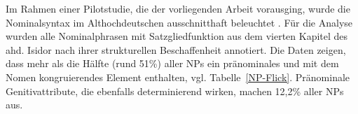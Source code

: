 
Im Rahmen einer Pilotstudie, die der vorliegenden Arbeit vorausging, wurde die Nominalsyntax im Althochdeutschen ausschnitthaft beleuchtet \parencite{Flick2018}. Für die Analyse wurden alle Nominalphrasen mit Satzgliedfunktion aus dem vierten Kapitel des ahd. Isidor nach ihrer strukturellen Beschaffenheit annotiert. Die Daten zeigen, dass mehr als die Hälfte (rund 51\%) aller NPs ein pränominales und mit dem Nomen kongruierendes Element enthalten, vgl. Tabelle~\ref{NP-Flick}. Pränominale Genitivattribute, die ebenfalls determinierend wirken, machen 12,2\% aller NPs aus. 

